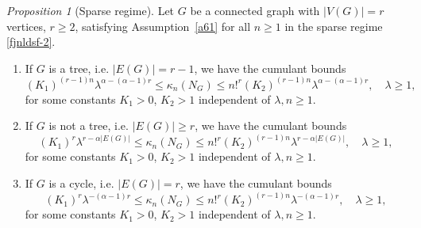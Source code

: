 \documentclass[bj,authoryear,noshowframe]{imsart}
\theoremstyle{plain}
\theoremstyle{remark}
\newtheorem{prop}{Proposition}[section]
\begin{document}
\begin{prop}[Sparse regime] 
\label{th6.4}
  Let $G$ be a connected graph with $|V(G)|=r$ vertices, $r\geq 2$,
  satisfying Assumption~\ref{a61} for all $n\geq 1$
  in the sparse regime \eqref{fjnldsf-2}. 
  \begin{enumerate}%
  \item 
 If $G$ is a tree, i.e. $|E(G)| = r-1$, we have the cumulant bounds %
\begin{equation} 
\label{cumulant-rhop2-0}
  (K_1)^{(r-1)n}
 \lambda^{\alpha  -(\alpha - 1)r }
     \leq 
  \kappa_n(N_G)
  \leq 
  n!^r
  (K_2)^{(r-1)n} \lambda^{ \alpha     -(\alpha - 1)r       } ,
  \quad \lambda \geq 1, 
\end{equation} 
 for some constants $K_1>0$, $K_2>1$ independent of $\lambda, n\geq 1$.
\item
 If $G$ is not a tree, i.e. $|E(G)|\geq r$,
 we have the cumulant bounds %
 \begin{equation} 
 \label{cumulant-rhoph1}
  (K_1)^r 
 \lambda^{r-\alpha |E(G)|}
 \leq 
  \kappa_n(N_G)
  \leq
   n!^r
   (K_2)^{(r-1)n}
   \lambda^{r-\alpha |E(G)|}, 
   \quad \lambda \geq 1,
 \end{equation} 
 for some constants $K_1>0$, $K_2>1$ independent of $\lambda, n\geq 1$. 
\item
  If $G$ is a cycle, i.e. $|E(G)| = r$,
  we have the cumulant bounds %
 \begin{equation} 
\label{cumulant-rhoph2}
  (K_1)^r 
 \lambda^{- (\alpha - 1 )r}
\leq 
  \kappa_n(N_G)
  \leq
  n!^r
  (K_2)^{(r-1)n}
  \lambda^{ - (\alpha -1)r},
    \quad \lambda \geq 1, 
\end{equation} 
 for some constants $K_1>0$, $K_2>1$ independent of $\lambda, n\geq 1$. 
\end{enumerate}
\end{prop}
\end{document}

